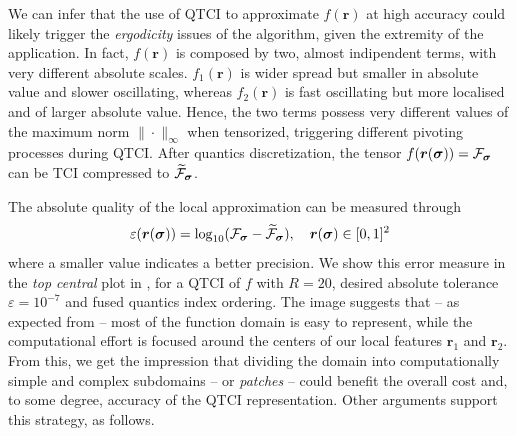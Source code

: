We can infer that the use of QTCI to approximate $f(\boldsymbol{r})$ at high accuracy could likely trigger the \textit{ergodicity} issues of the algorithm, given the extremity of the application. In fact, $f(\boldsymbol{r})$ is composed by two, almost indipendent terms, with very different absolute scales. $f_1(\boldsymbol{r})$ is wider spread but smaller in absolute value and slower oscillating, whereas $f_2(\boldsymbol{r})$ is fast oscillating but more localised and of larger absolute value. Hence, the two terms possess very different values of the maximum norm $\| \cdot \|_\infty$ when tensorized, triggering different pivoting processes during QTCI. After quantics discretization, the tensor $f(\boldsymbol{r}(\boldsymbol{\sigma})) = \mathcal{F}_{\boldsymbol{\sigma}}$ can be TCI compressed to $\widetilde{\mathcal{F}}_{\boldsymbol{\sigma}}$. 

The absolute quality of the local approximation can be measured through 
\begin{equation}
	\varepsilon(\boldsymbol{r}(\boldsymbol{\sigma})) = \log_{10}(\mathcal{F}_{\boldsymbol{\sigma}} - \widetilde{\mathcal{F}}_{\boldsymbol{\sigma}}), \quad \boldsymbol{r}(\boldsymbol{\sigma}) \in [0,1]^2
	\label{eq:logTCIerror}
\end{equation}
where a smaller value indicates a better precision. 
We show this error measure in the \textit{top central} plot in , for a QTCI of $f$ with $R=20$, desired absolute tolerance $\varepsilon = 10^{-7}$ and fused quantics index ordering. The image suggests that -- as expected from  -- most of the function domain is easy to represent, while the computational effort is focused around the centers of our local features $\boldsymbol{r}_1$ and $\boldsymbol{r}_2$. From this, we get the impression that dividing the domain into computationally simple and complex subdomains -- or \textit{patches} -- could benefit the overall cost and, to some degree, accuracy of the QTCI representation. Other arguments support this strategy, as follows. 

